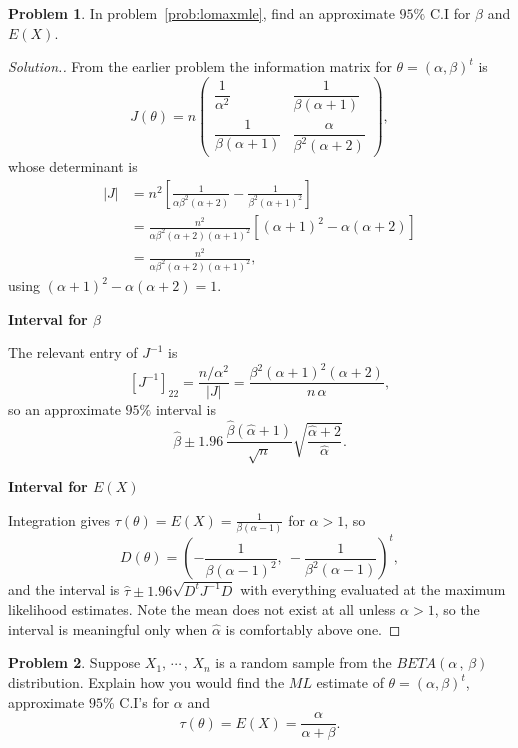 \documentclass[12pt,a4paper]{report}
\theoremstyle{definition}
\newcommand{\subhead}[1]{%
  \par\medskip\noindent\textbf{#1}\par\nobreak\smallskip}
\newtheorem{problemx}{Problem}[section]
\newenvironment{problem}{\begin{problemx}}{\end{problemx}}
\newenvironment{solution}
  {\renewcommand{\qedsymbol}{}\begin{proof}[\textit{Solution}.]}
  {\end{proof}}
\begin{document}
\begin{problem}
In problem~\ref{prob:lomaxmle}, find an approximate $95\%$ C.I for $\beta$ and $E(X)$.
\end{problem}

\begin{solution}
From the earlier problem the information matrix for $\theta=(\alpha,\beta)^{t}$ is
\[J(\theta) = n\begin{pmatrix}
\dfrac{1}{\alpha^{2}} & \dfrac{1}{\beta(\alpha+1)}\\[6pt]
\dfrac{1}{\beta(\alpha+1)} & \dfrac{\alpha}{\beta^{2}(\alpha+2)}\end{pmatrix},\]
whose determinant is
\begin{align*}
\left|J\right| &= n^{2}\left[\frac{1}{\alpha\beta^{2}(\alpha+2)}
- \frac{1}{\beta^{2}(\alpha+1)^{2}}\right]\\
&= \frac{n^{2}}{\alpha\beta^{2}(\alpha+2)(\alpha+1)^{2}}
\left[(\alpha+1)^{2}-\alpha(\alpha+2)\right]\\
&= \frac{n^{2}}{\alpha\beta^{2}(\alpha+2)(\alpha+1)^{2}} ,
\end{align*}
using $(\alpha+1)^{2}-\alpha(\alpha+2)=1$.

\subhead{Interval for $\beta$}
The relevant entry of $J^{-1}$ is
\[\left[J^{-1}\right]_{22} = \frac{n/\alpha^{2}}{\left|J\right|}
= \frac{\beta^{2}(\alpha+1)^{2}(\alpha+2)}{n\,\alpha},\]
so an approximate $95\%$ interval is
\[\widehat{\beta} \pm 1.96\,\frac{\widehat{\beta}\left(\widehat{\alpha}+1\right)}{\sqrt{n}}
\sqrt{\frac{\widehat{\alpha}+2}{\widehat{\alpha}}} .\]

\subhead{Interval for $E(X)$}
Integration gives $\tau(\theta)=E(X)=\frac{1}{\beta(\alpha-1)}$ for $\alpha>1$,
so
\[D(\theta) = \left(-\frac{1}{\beta(\alpha-1)^{2}},\ -\frac{1}{\beta^{2}(\alpha-1)}\right)^{t},\]
and the interval is $\widehat{\tau} \pm 1.96\sqrt{D^{t}J^{-1}D}$ with everything
evaluated at the maximum likelihood estimates. Note the mean does not exist at
all unless $\alpha>1$, so the interval is meaningful only when
$\widehat{\alpha}$ is comfortably above one.
\end{solution}

\begin{problem}
Suppose $X_1, \, \cdots\, , \, X_n$ is a random sample from  the $BETA(\alpha\, ,\, \beta)$ distribution. Explain how you would find the $ML$ estimate of $\theta = (\alpha, \beta)^t$, approximate $95\%$ C.I's for $\alpha$ and \[\tau(\theta) = E(X) = \frac{\alpha}{\alpha + \beta}.\]
\end{problem}
\end{document}
